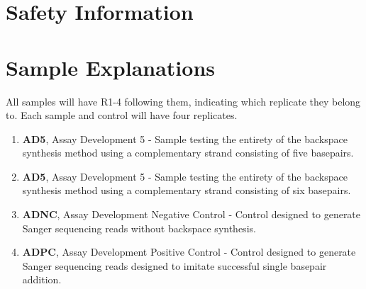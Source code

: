 \documentclass{ssiBio}
\begin{document}
\section{Safety Information}
\begin{safety}
  \begin{enumerate}
    \SYBRGOLD
  \end{enumerate}
\end{safety}

\section{Sample Explanations}
All samples will have R1-4 following them, indicating which replicate they belong to. Each sample and control will have four replicates.
\begin{enumerate}
  \item{\textbf{AD5}, Assay Development 5 - Sample testing the entirety of the backspace synthesis method using a complementary strand consisting of five basepairs.}
  \item{\textbf{AD5}, Assay Development 5 - Sample testing the entirety of the backspace synthesis method using a complementary strand consisting of six basepairs.}
  \item{\textbf{ADNC}, Assay Development Negative Control - Control designed to generate Sanger sequencing reads without backspace synthesis.}
  \item{\textbf{ADPC}, Assay Development Positive Control - Control designed to generate Sanger sequencing reads designed to imitate successful single basepair addition.}
\end{enumerate}
\end{document}
